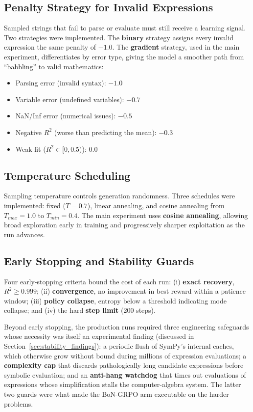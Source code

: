 \subsection{Penalty Strategy for Invalid Expressions}

Sampled strings that fail to parse or evaluate must still receive a learning signal. Two strategies were implemented. The \textbf{binary} strategy assigns every invalid expression the same penalty of $-1.0$. The \textbf{gradient} strategy, used in the main experiment, differentiates by error type, giving the model a smoother path from ``babbling'' to valid mathematics:

\begin{itemize}
    \item Parsing error (invalid syntax): $-1.0$
    \item Variable error (undefined variables): $-0.7$
    \item NaN/Inf error (numerical issues): $-0.5$
    \item Negative $R^2$ (worse than predicting the mean): $-0.3$
    \item Weak fit ($R^2 \in [0, 0.5)$): $0.0$
\end{itemize}

\subsection{Temperature Scheduling}

Sampling temperature controls generation randomness. Three schedules were implemented: fixed ($T = 0.7$), linear annealing, and cosine annealing from $T_{max}=1.0$ to $T_{min}=0.4$. The main experiment uses \textbf{cosine annealing}, allowing broad exploration early in training and progressively sharper exploitation as the run advances.

\subsection{Early Stopping and Stability Guards}
\label{sec:guards}

Four early-stopping criteria bound the cost of each run: (i) \textbf{exact recovery}, $R^2 \geq 0.999$; (ii) \textbf{convergence}, no improvement in best reward within a patience window; (iii) \textbf{policy collapse}, entropy below a threshold indicating mode collapse; and (iv) the hard \textbf{step limit} (200 steps).

Beyond early stopping, the production runs required three engineering safeguards whose necessity was itself an experimental finding (discussed in Section~\ref{sec:stability_findings}): a periodic flush of SymPy's internal caches, which otherwise grow without bound during millions of expression evaluations; a \textbf{complexity cap} that discards pathologically long candidate expressions before symbolic evaluation; and an \textbf{anti-hang watchdog} that times out evaluations of expressions whose simplification stalls the computer-algebra system. The latter two guards were what made the BoN-GRPO arm executable on the harder problems.

